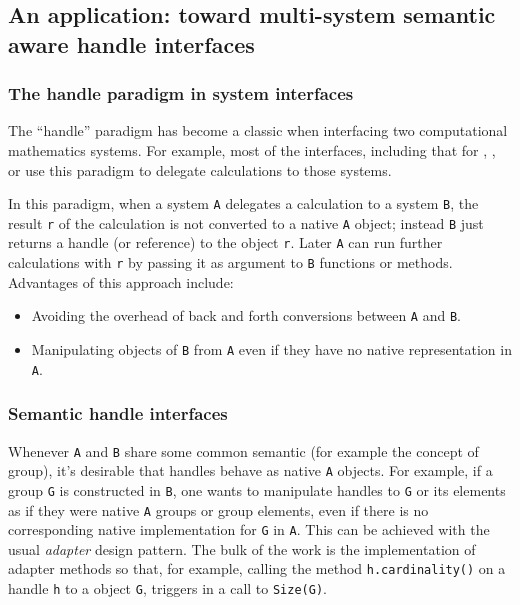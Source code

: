 \subsection{An application: toward multi-system semantic aware handle interfaces}

\subsubsection{The handle paradigm in system interfaces}\label{the-handle-paradigm-in-system-interfaces}

The ``handle'' paradigm has become a classic when interfacing two
computational mathematics systems. For example, most of the \Sage
interfaces, including that for \GAP, \Singular, or \Pari use this
paradigm to delegate calculations to those systems.

In this paradigm, when a system \texttt{A} delegates a calculation to a
system \texttt{B}, the result \texttt{r} of the calculation is not
converted to a native \texttt{A} object; instead \texttt{B} just returns
a handle (or reference) to the object \texttt{r}. Later \texttt{A} can
run further calculations with \texttt{r} by passing it as argument to
\texttt{B} functions or methods. Advantages of this approach include:

\begin{itemize}
\item Avoiding the overhead of back and forth conversions between
  \texttt{A} and \texttt{B}.
\item Manipulating objects of \texttt{B} from \texttt{A} even if they
  have no native representation in \texttt{A}.
\end{itemize}

\subsubsection{Semantic handle interfaces}\label{semantic-handle-interfaces}

Whenever \texttt{A} and \texttt{B} share some common semantic (for
example the concept of group), it's desirable that handles behave as
native \texttt{A} objects. For example, if a group \texttt{G} is
constructed in \texttt{B}, one wants to manipulate handles to
\texttt{G} or its elements as if they were native \texttt{A} groups or
group elements, even if there is no corresponding native
implementation for \texttt{G} in \texttt{A}.  This can be achieved
with the usual \emph{adapter} design pattern. The bulk of the work is
the implementation of adapter methods so that, for example, calling
the method \texttt{h.cardinality()} on a \Sage handle \texttt{h} to a
\GAP object \texttt{G}, triggers in \GAP a call to \texttt{Size(G)}.

